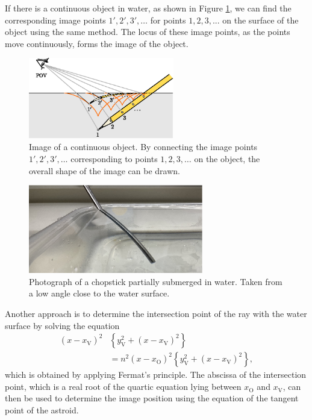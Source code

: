 \documentclass[twocolumn]{article}
\begin{document}
If there is a continuous object in water, as shown in Figure \ref{fig:extended_image}, we can find the corresponding image points $1', 2', 3', \dots$ for points $1, 2, 3, ...$ on the surface of the object using the same method. The locus of these image points, as the points move continuously, forms the image of the object.

\begin{figure}[h]
	\centering
	\includegraphics*[width=2.5in]{figs/g242.eps}
	\caption{Image of a continuous object. By connecting the image points $1', 2', 3', \dots$ corresponding to points $1, 2, 3, \dots$ on the object, the overall shape of the image can be drawn.}
	\label{fig:extended_image}
\end{figure}

\begin{figure}[!h]
	\centering
	\includegraphics[width=3in]{figs/img_1805_2.eps}
	\caption{Photograph of a chopstick partially submerged in water. Taken from a low angle close to the water surface.}
	\label{fig:picture}
\end{figure}

Another approach is to determine the intersection point of the ray with the water surface by solving the equation
\[ \begin{aligned}
	\left( x - x_{\mathrm{V}}^{} \right)^2 &\left\{ y_{\mathrm{V}}^2 + \left(x - x_{\mathrm{V}}^{} \right)^2 \right\} \\
	&= n^2 \left( x - x_{\mathrm{O}}^{} \right)^2 \left\{ y_{\mathrm{V}}^2 + \left(x - x_{\mathrm{V}}^{} \right)^2 \right\},
\end{aligned}
\]
which is obtained by applying Fermat's principle. The abscissa of the intersection point, which is a real root of the quartic equation
lying between $x_{\mathrm{O}}^{}$ and $x_{\mathrm{V}}^{}$, can then be used to determine the image position using the equation of the tangent point of the astroid.
\end{document}
